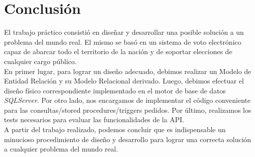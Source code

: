 \documentclass[10pt,a4paper]{article}
\begin{document}
\section{Conclusión}

El trabajo práctico consistió en diseñar y desarrollar una posible solución a un problema del mundo real. El mismo se basó en un sistema de voto electrónico capaz de abarcar todo el territorio de la nación y de soportar elecciones de cualquier cargo público.\\
En primer lugar, para lograr un diseño adecuado, debimos realizar un Modelo de Entidad Relación y su Modelo Relacional derivado.
Luego, debimos efectuar el diseño físico correspondiente implementado en el motor de base de datos \textit{SQLServer}.
Por otro lado, nos encargamos de implementar el código conveniente para las consultas/stored procedures/triggers pedidos.
Por último, realizamos los tests necesarios para evaluar las funcionalidades de la API.\\
A partir del trabajo realizado, podemos concluir que es indispensable un minucioso procedimiento de diseño y desarrollo para lograr una correcta solución a cualquier problema del mundo real. 
\end{document}
